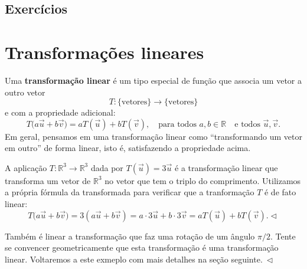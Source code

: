 \subsection*{Exercícios}

\construirExer


\section{Transformações lineares}


Uma \textbf{transformação linear} é um tipo especial de função que associa um vetor a outro vetor
\begin{equation}
T: \{ \text{vetores} \} \to \{ \text{vetores} \}
\end{equation} e com a propriedade adicional:
\begin{equation}
T\big( a \vec{u} + b \vec{v} \big) = aT(\vec{u}) + bT(\vec{v}), \quad \text{para todos } a, b \in \mathbb{R} \quad \text{e todos } \vec{u}, \vec{v}.
\end{equation}
Em geral, pensamos em uma transformação linear como ``transformando um vetor em outro'' de forma linear, isto é, satisfazendo a propriedade acima.


\begin{ex}
A aplicação $T: \mathbb{R}^3 \to \mathbb{R}^3$ dada por $T(\vec{u}) = 3\vec{u}$ é a transformação linear que transforma um vetor de $\mathbb{R}^3$ no vetor que tem o triplo do comprimento. Utilizamos a própria fórmula da transformada para verificar que a tranformação $T$ é de fato linear:
\begin{equation}
T\big( a \vec{u} + b \vec{v} \big) = 3 ( a \vec{u} + b \vec{v} ) = a \cdot 3 \vec{u} + b \cdot 3 \vec{v} = aT(\vec{u}) + bT(\vec{v}). \lhd
\end{equation}
\end{ex}


\begin{ex}\label{exp:4}
Também é linear a transformação que faz uma rotação de um ângulo $\pi / 2$. Tente se convencer geometricamente que esta transformação é uma transformação linear. Voltaremos a este exmeplo com mais detalhes na seção seguinte$. \ \lhd$
\end{ex}



